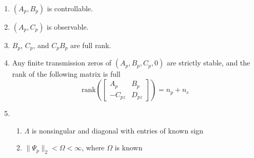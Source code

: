 \documentclass[]{../sty/JGCD}
\theoremstyle{examplestyle}
\newenvironment{customthm}[1]
  {\renewcommand\theinnercustomthm{#1}\innercustomthm\normalfont}
  {\endinnercustomthm}
\begin{document}
  \begin{customthm}{1} $\;$\label{ass.plant}
    \begin{enumerate}[\Alph{enumi}), ref=\Alph{enumi}] %
    \itemsep0em
    \item{$(A_{p},B_{p})$ is controllable.\label{ass.p.cont}}
    \item{$(A_{p},C_{p})$ is observable.\label{ass.p.obsv}}
    \item{$B_{p}$, $C_{p}$, and $C_{p}B_{p}$ are full rank.\label{ass.p.rank}}
    \item{Any finite transmission zeros of $(A_{p},B_{p},C_{p},0)$ are strictly stable, and the rank of the following matrix is full\label{ass.p.tzero}}
    \begin{equation*}
      \text{rank}\left(
      \begin{bmatrix}
        A_{p} & B_{p} \\
        -C_{pz} & D_{pz}
      \end{bmatrix}\right)
      =n_{p}+n_{e}
    \end{equation*}
    \item{%
      \begin{enumerate}[(\alph{enumii}), ref=\alph{enumii}]
        \item{$\Lambda$ is nonsingular and diagonal with entries of known sign\label{ass.p.unc.lambda}}
        \item{$\|\Psi_{p}\|_{2}<\Omega<\infty$, where $\Omega$ is known\label{ass.p.unc.wp}}
      \end{enumerate}\label{ass.p.unc}
    }
    \end{enumerate}
  \end{customthm}
\end{document}
